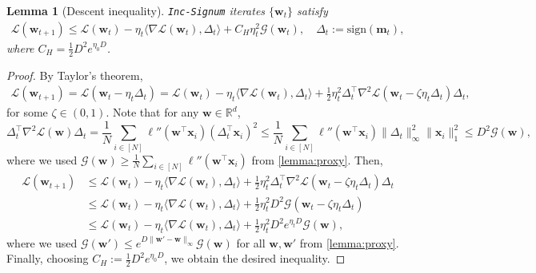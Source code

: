 \documentclass{article} %
\theoremstyle{plain}
\newtheorem{lemma}[theorem]{Lemma}
\theoremstyle{definition}
\theoremstyle{remark}
\def\gG{{\mathcal{G}}}
\newcommand{\Ls}{\mathcal{L}}
\def\bm{{\mathbf m}}
\def\bx{{\mathbf x}}
\def\bw{{\mathbf w}}
\begin{document}
\begin{lemma}[Descent inequality]\label{lemma:descent_inequality}
    \textnormal{\texttt{Inc-Signum}} iterates $\{\bw_t\}$ satisfy
    \begin{align*}
        \Ls(\bw_{t+1}) \leq \Ls(\bw_t) - \eta_t \langle \nabla \Ls(\bw_t), \Delta_t\rangle + C_H \eta_t^2 \gG(\bw_t),\quad \Delta_t:=\mathrm{sign}(\bm_t),
    \end{align*}
    where $C_H=\frac{1}{2}D^2e^{\eta_0D}$.
\end{lemma}
\begin{proof}
    By Taylor's theorem,
    \begin{align*}
        \Ls(\bw_{t+1}) = \Ls(\bw_t - \eta_t\Delta_t) = \Ls(\bw_t) - \eta_t \langle \nabla \Ls (\bw_t), \Delta_t\rangle + \frac{1}{2}\eta_t^2 \Delta_t^\top \nabla^2 \Ls (\bw_t - \zeta \eta_t \Delta_t) \Delta_t, 
    \end{align*}
    for some $\zeta\in(0,1)$. Note that for any $\bw\in \mathbb R^d$,
    \[
    \Delta_t^\top \nabla^2 \Ls (\bw) \Delta_t = \frac1N \sum_{i\in [N]} \ell''(\bw^\top \bx_i) (\Delta_t^\top \bx_i)^2 \leq \frac{1}{N} \sum_{i\in [N]} \ell''(\bw^\top \bx_i) \|\Delta_t\|_\infty^2 \|\bx_i\|_1^2 \leq D^2 \gG (\bw),
    \]
    where we used $\gG (\bw)\geq \frac{1}{N}\sum_{i\in [N]} \ell''(\bw^\top \bx_i)$ from \cref{lemma:proxy}. Then,
    \begin{align*}
        \Ls(\bw_{t+1}) &\leq \Ls(\bw_t) - \eta_t \langle \nabla \Ls (\bw_t), \Delta_t\rangle + \frac{1}{2}\eta_t^2 \Delta_t^\top \nabla^2 \Ls (\bw_t - \zeta \eta_t \Delta_t) \Delta_t \\
        &\leq \Ls(\bw_t) - \eta_t \langle \nabla \Ls (\bw_t), \Delta_t\rangle  + \frac{1}{2} \eta_t^2 D^2 \gG(\bw_t - \zeta \eta_t \Delta_t) \\
        &\leq \Ls(\bw_t) - \eta_t \langle \nabla \Ls (\bw_t), \Delta_t\rangle + \frac{1}{2} \eta_t^2 D^2 e^{\eta_tD} \gG(\bw),
    \end{align*}
    where we used $\gG(\bw')\leq e^{D\|\bw'-\bw\|_\infty} \gG(\bw)$ for all $\bw,\bw'$ from \cref{lemma:proxy}. Finally, choosing $C_H := \frac{1}{2}D^2e^{\eta_0D}$, we obtain the desired inequality.
\end{proof}
\end{document}
